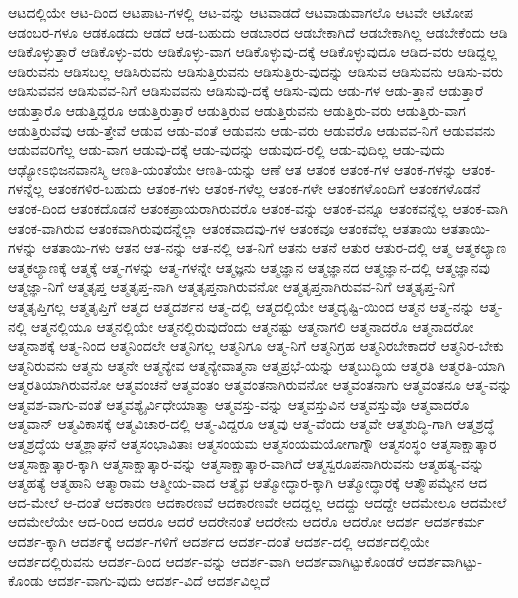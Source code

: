 {ಆಟದಲ್ಲಿಯೇ
ಆಟ-ದಿಂದ
ಆಟಪಾಟ-ಗಳಲ್ಲಿ
ಆಟ-ವನ್ನು
ಆಟವಾಡದೆ
ಆಟವಾಡುವಾಗಲೊ
ಆಟವೇ
ಆಟೋಪ
ಆಡಂಬರ-ಗಳೂ
ಆಡಕೂಡದು
ಆಡದೆ
ಆಡ-ಬಹುದು
ಆಡಬಾರದ
ಆಡಬೇಕಾಗಿದೆ
ಆಡಬೇಕಾಗಿಲ್ಲ
ಆಡಬೇಕೆಂದು
ಆಡಿ
ಆಡಿಕೊಳ್ಳುತ್ತಾರೆ
ಆಡಿಕೊಳ್ಳು-ವರು
ಆಡಿಕೊಳ್ಳು-ವಾಗ
ಆಡಿಕೊಳ್ಳುವು-ದಕ್ಕೆ
ಆಡಿಕೊಳ್ಳುವುದೂ
ಆಡಿದ-ವರು
ಆಡಿದ್ದಲ್ಲ
ಆಡಿರುವನು
ಆಡಿಸಬಲ್ಲ
ಆಡಿಸಿರುವನು
ಆಡಿಸುತ್ತಿರುವನು
ಆಡಿಸುತ್ತಿರು-ವುದನ್ನು
ಆಡಿಸುವ
ಆಡಿಸುವನು
ಆಡಿಸು-ವರು
ಆಡಿಸುವವನ
ಆಡಿಸುವವ-ನಿಗೆ
ಆಡಿಸುವವನು
ಆಡಿಸುವು-ದಕ್ಕೆ
ಆಡಿಸು-ವುದು
ಆಡು-ಗಳ
ಆಡು-ತ್ತಾನೆ
ಆಡುತ್ತಾರೆ
ಆಡುತ್ತಾರೊ
ಆಡುತ್ತಿದ್ದರೂ
ಆಡುತ್ತಿರುತ್ತಾರೆ
ಆಡುತ್ತಿರುವ
ಆಡುತ್ತಿರುವನು
ಆಡುತ್ತಿರು-ವರು
ಆಡುತ್ತಿರು-ವಾಗ
ಆಡುತ್ತಿರುವೆವು
ಆಡು-ತ್ತೇವೆ
ಆಡುವ
ಆಡು-ವಂತೆ
ಆಡುವನು
ಆಡು-ವರು
ಆಡುವರೊ
ಆಡುವವ-ನಿಗೆ
ಆಡುವವನು
ಆಡುವವರಿಗೆಲ್ಲ
ಆಡು-ವಾಗ
ಆಡುವು-ದಕ್ಕೆ
ಆಡು-ವುದನ್ನು
ಆಡುವುದ-ರಲ್ಲಿ
ಆಡು-ವುದಿಲ್ಲ
ಆಡು-ವುದು
ಆಢ್ಯೋಽಭಿಜನವಾನಸ್ಮಿ
ಆಣತಿ-ಯಂತೆಯೇ
ಆಣತಿ-ಯನ್ನು
ಆಣೆ
ಆತ
ಆತಂಕ
ಆತಂಕ-ಗಳ
ಆತಂಕ-ಗಳನ್ನು
ಆತಂಕ-ಗಳನ್ನೆಲ್ಲ
ಆತಂಕಗಳಿರ-ಬಹುದು
ಆತಂಕ-ಗಳು
ಆತಂಕ-ಗಳೆಲ್ಲ
ಆತಂಕ-ಗಳೇ
ಆತಂಕಗಳೊಂದಿಗೆ
ಆತಂಕಗಳೊಡನೆ
ಆತಂಕ-ದಿಂದ
ಆತಂಕದೊಡನೆ
ಆತಂಕಪ್ರಾಯರಾಗಿರುವರೊ
ಆತಂಕ-ವನ್ನು
ಆತಂಕ-ವನ್ನೂ
ಆತಂಕವನ್ನೆಲ್ಲ
ಆತಂಕ-ವಾಗಿ
ಆತಂಕ-ವಾಗಿರುವ
ಆತಂಕವಾಗಿರುವುದನ್ನೆಲ್ಲಾ
ಆತಂಕವಾದವು-ಗಳ
ಆತಂಕವೂ
ಆತಂಕವೆಲ್ಲ
ಆತತಾಯಿ
ಆತತಾಯಿ-ಗಳನ್ನು
ಆತತಾಯಿ-ಗಳು
ಆತನ
ಆತ-ನನ್ನು
ಆತ-ನಲ್ಲಿ
ಆತ-ನಿಗೆ
ಆತನು
ಆತನೆ
ಆತುರ
ಆತುರ-ದಲ್ಲಿ
ಆತ್ಮ
ಆತ್ಮಕಲ್ಯಾಣ
ಆತ್ಮಕಲ್ಯಾಣಕ್ಕೆ
ಆತ್ಮಕ್ಕೆ
ಆತ್ಮ-ಗಳನ್ನು
ಆತ್ಮ-ಗಳನ್ನೇ
ಆತ್ಮಜ್ಞನು
ಆತ್ಮಜ್ಞಾನ
ಆತ್ಮಜ್ಞಾನದ
ಆತ್ಮಜ್ಞಾನ-ದಲ್ಲಿ
ಆತ್ಮಜ್ಞಾನವು
ಆತ್ಮಜ್ಞಾ-ನಿಗೆ
ಆತ್ಮತೃಪ್ತ
ಆತ್ಮತೃಪ್ತ-ನಾಗಿ
ಆತ್ಮತೃಪ್ತನಾಗಿರುವನೋ
ಆತ್ಮತೃಪ್ತನಾಗಿರುವವ-ನಿಗೆ
ಆತ್ಮತೃಪ್ತ-ನಿಗೆ
ಆತ್ಮತೃಪ್ತಿಗಲ್ಲ
ಆತ್ಮತೃಪ್ತಿಗೆ
ಆತ್ಮದ
ಆತ್ಮದರ್ಶನ
ಆತ್ಮ-ದಲ್ಲಿ
ಆತ್ಮದಲ್ಲಿಯೇ
ಆತ್ಮದೃಷ್ಟಿ-ಯಿಂದ
ಆತ್ಮನ
ಆತ್ಮ-ನನ್ನು
ಆತ್ಮ-ನಲ್ಲಿ
ಆತ್ಮನಲ್ಲಿಯೂ
ಆತ್ಮನಲ್ಲಿಯೇ
ಆತ್ಮನಲ್ಲಿರುವುದೆಂದು
ಆತ್ಮನಷ್ಟು
ಆತ್ಮನಾಗಲಿ
ಆತ್ಮನಾದರೊ
ಆತ್ಮನಾದರೋ
ಆತ್ಮನಾಶಕ್ಕೆ
ಆತ್ಮ-ನಿಂದ
ಆತ್ಮನಿಂದಲೇ
ಆತ್ಮನಿಗಲ್ಲ
ಆತ್ಮನಿಗೂ
ಆತ್ಮ-ನಿಗೆ
ಆತ್ಮನಿಗ್ರಹ
ಆತ್ಮನಿರಬೇಕಾದರೆ
ಆತ್ಮನಿರ-ಬೇಕು
ಆತ್ಮನಿರುವನು
ಆತ್ಮನು
ಆತ್ಮನೇ
ಆತ್ಮನ್ಯೇವ
ಆತ್ಮನ್ಯೇವಾತ್ಮನಾ
ಆತ್ಮಪ್ರಭೆ-ಯನ್ನು
ಆತ್ಮಬುದ್ಧಿಯ
ಆತ್ಮರತಿ
ಆತ್ಮರತಿ-ಯಾಗಿ
ಆತ್ಮರತಿಯಾಗಿರುವನೋ
ಆತ್ಮವಂಚನೆ
ಆತ್ಮವಂತಂ
ಆತ್ಮವಂತನಾಗಿರುವನೋ
ಆತ್ಮವಂತನಾಗು
ಆತ್ಮವಂತನೂ
ಆತ್ಮ-ವನ್ನು
ಆತ್ಮವಶ-ವಾಗು-ವಂತೆ
ಆತ್ಮವಶ್ಯೈರ್ವಿಧೇಯಾತ್ಮಾ
ಆತ್ಮವಸ್ತು-ವನ್ನು
ಆತ್ಮವಸ್ತುವಿನ
ಆತ್ಮವಸ್ತುವೊ
ಆತ್ಮವಾದರೊ
ಆತ್ಮವಾನ್
ಆತ್ಮವಿಕಾಸಕ್ಕೆ
ಆತ್ಮವಿಚಾರ-ದಲ್ಲಿ
ಆತ್ಮ-ವಿದ್ದರೂ
ಆತ್ಮವು
ಆತ್ಮ-ವೆಂದು
ಆತ್ಮವೇ
ಆತ್ಮಶುದ್ಧಿ-ಗಾಗಿ
ಆತ್ಮಶ್ರದ್ಧೆ
ಆತ್ಮಶ್ರದ್ಧೆಯ
ಆತ್ಮಶ್ಲಾಘನೆ
ಆತ್ಮಸಂಭಾವಿತಾಃ
ಆತ್ಮಸಂಯಮ
ಆತ್ಮಸಂಯಮಯೋಗಾಗ್ನೌ
ಆತ್ಮಸಂಸ್ಥಂ
ಆತ್ಮಸಾಕ್ಷಾತ್ಕಾರ
ಆತ್ಮಸಾಕ್ಷಾತ್ಕಾರ-ಕ್ಕಾಗಿ
ಆತ್ಮಸಾಕ್ಷಾತ್ಕಾರ-ವನ್ನು
ಆತ್ಮಸಾಕ್ಷಾತ್ಕಾರ-ವಾಗಿದೆ
ಆತ್ಮಸ್ವರೂಪನಾಗಿರುವನು
ಆತ್ಮಹತ್ಯ-ವನ್ನು
ಆತ್ಮಹತ್ಯೆ
ಆತ್ಮಹಾನಿ
ಆತ್ಮಾರಾಮ
ಆತ್ಮೀಯ-ವಾದ
ಆತ್ಮೈವ
ಆತ್ಮೋದ್ಧಾರ-ಕ್ಕಾಗಿ
ಆತ್ಮೋದ್ಧಾರಕ್ಕೆ
ಆತ್ಮೌಪಮ್ಯೇನ
ಆದ
ಆದ-ಮೇಲೆ
ಆ-ದಂತೆ
ಆದಕಾರಣ
ಆದಕಾರಣವೆ
ಆದಕಾರಣವೇ
ಆದದ್ದಲ್ಲ
ಆದದ್ದು
ಆದದ್ದೇ
ಆದಮೇಲೂ
ಆದಮೇಲೆ
ಆದಮೇಲೆಯೇ
ಆದ-ರಿಂದ
ಆದರೂ
ಆದರೆ
ಆದರೇನಂತೆ
ಆದರೇನು
ಆದರೊ
ಆದರೋ
ಆದರ್ಶ
ಆದರ್ಶಕರ್ಮ
ಆದರ್ಶ-ಕ್ಕಾಗಿ
ಆದರ್ಶಕ್ಕೆ
ಆದರ್ಶ-ಗಳಿಗೆ
ಆದರ್ಶದ
ಆದರ್ಶ-ದಂತೆ
ಆದರ್ಶ-ದಲ್ಲಿ
ಆದರ್ಶದಲ್ಲಿಯೇ
ಆದರ್ಶದಲ್ಲಿರುವನು
ಆದರ್ಶ-ದಿಂದ
ಆದರ್ಶ-ವನ್ನು
ಆದರ್ಶ-ವಾಗಿ
ಆದರ್ಶವಾಗಿಟ್ಟುಕೊಂಡರೆ
ಆದರ್ಶವಾಗಿಟ್ಟು-ಕೊಂಡು
ಆದರ್ಶ-ವಾಗು-ವುದು
ಆದರ್ಶ-ವಿದೆ
ಆದರ್ಶವಿಲ್ಲದೆ
}
